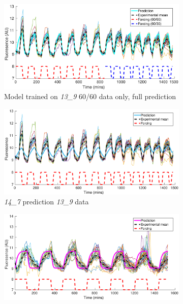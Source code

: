\documentclass[10pt,journal]{./IEEE_latex_class/IEEEtran}
\begin{document}
 \begin{figure}[h]	
 	\begin{subfigure}[h]{0.49\textwidth}
    \centering
        \includegraphics[scale = 0.29,clip = true, trim = 82 0 70 0]{13_9_partial_data_13_9_pred}
        \caption{Model trained on \textit{13\_9}  60/60 data only, full prediction}
        \label{CrossValidation_1} 
    \end{subfigure}
	\begin{subfigure}[h]{0.49\textwidth}
    \centering
        \includegraphics[scale = 0.3,clip = true, trim = 87 0 70 0]{14_7_pred_13_9_data}
        \caption{\textit{14\_7} prediction \textit{13\_9} data}
        \label{CrossValidation_2} 
    \end{subfigure}
    \begin{subfigure}[h]{0.49\textwidth}
    \centering
        \includegraphics[scale = 0.3,clip = true, trim = 87 0 70 0]{13_9_pred_14_7_data}

\end{subfigure}
\end{figure}
\end{document}
